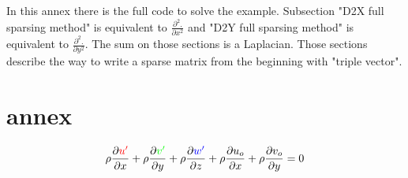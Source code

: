 \documentclass[ border=0pt, a4paper, 11pt]{article}
\numberwithin{equation}{section}
\renewcommand{\u}{\textcolor{red}{u'}}
\renewcommand{\v}{\textcolor{green}{v'}}
\newcommand{\w}{\textcolor{blue}{w'}}
\begin{document}
In this annex there is the full code to solve the example. Subsection "D2X full sparsing method" is equivalent to $\frac{\partial^2 .}{\partial x^2}$ and "D2Y full sparsing method" is equivalent to $\frac{\partial^2 .}{\partial y^2}$. The sum on those sections is a Laplacian. Those sections describe the way to write a sparse matrix from the beginning with "triple vector".


\section{annex}




\begin{equation}
 \rho\frac{\partial \u }{\partial x} + \rho\frac{\partial \v }{\partial y} + \rho\frac{\partial \w }{\partial z} + \rho\frac{\partial u_o}{\partial x} + \rho\frac{\partial v_o}{\partial y}  =0
\end{equation}
\end{document}
